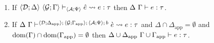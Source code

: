 \begingroup
\def\thetheorem{\ref{thm:typed-expansion-full-U}}
\begin{theorem} ~
\begin{enumerate}
\item If $\langle \mathcal{D}; \Delta \rangle~\langle \mathcal{G}; \Gamma \rangle \vdash_{\langle \mathcal{A}; \Psi \rangle} {\hat e} \leadsto e : \tau$ then $\Delta~\Gamma \vdash e : \tau$.
\item If $\Delta~\Gamma\vdash^{\langle \mathcal{D}; \Delta_\text{app} \rangle;\,\langle \mathcal{G}; \Gamma_\text{app} \rangle;\,\langle \mathcal{A}; \Psi \rangle;\,b} \grave{e} \leadsto e : \tau$ and $\Delta \cap \Delta_\text{app} = \emptyset$ and $\text{dom}(\Gamma) \cap \text{dom}(\Gamma_\text{app}) = \emptyset$ then ${\Delta}\cup{\Delta_\text{app}}~{\Gamma}\cup{\Gamma_\text{app}} \vdash e : \tau$.
\end{enumerate}
\end{theorem}
\endgroup
